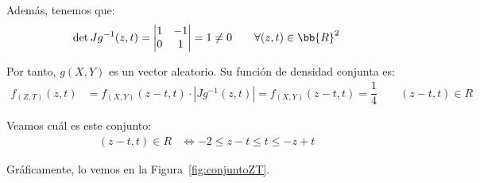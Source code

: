 \documentclass[12pt]{article}
\begin{document}
\begin{ejercicio}
\begin{enumerate}
            Además, tenemos que:
            \begin{equation*}
                \det Jg^{-1}(z,t) = \begin{vmatrix}
                    1 & -1\\
                    0 & 1
                \end{vmatrix} = 1\neq 0\qquad \forall (z,t)\in \bb{R}^2
            \end{equation*}

            Por tanto, $g(X,Y)$ es un vector aleatorio. Su función de densidad conjunta es:
            \begin{align*}
                f_{(Z,T)}(z,t) &= f_{(X,Y)}(z-t,t) \cdot |Jg^{-1}(z,t)| = f_{(X,Y)}(z-t,t) = \dfrac{1}{4}\qquad (z-t,t)\in R
            \end{align*}

            Veamos cuál es este conjunto:
            \begin{align*}
                (z-t,t) \in R &\Longleftrightarrow -2\leq z-t\leq t\leq -z+t
            \end{align*}

            Gráficamente, lo vemos en la Figura~\ref{fig:conjuntoZT}.
            \begin{figure}[H]
                \centering
\end{figure}
\end{enumerate}
\end{ejercicio}
\end{document}
